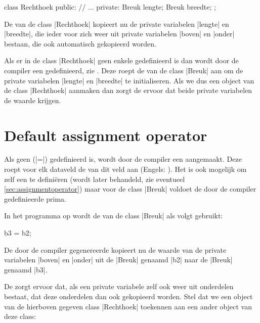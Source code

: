 \begin{cpplstShortInline}
\begin{cpplstfragment}
class Rechthoek {
public:
    // ...
private:
    Breuk lengte;
    Breuk breedte;
};
\end{cpplstfragment}

De  van de class |Rechthoek| kopieert nu de private variabelen |lengte| en |breedte|, die ieder voor zich weer uit private variabelen |boven| en |onder| bestaan, die ook automatisch gekopieerd worden.

Als er in de class |Rechthoek| geen enkele  gedefinieerd is dan wordt door de compiler een  gedefinieerd, zie . Deze  roept de  van de class |Breuk| aan om de private variabelen |lengte| en |breedte| te initialiseren. Als we dus een object van de class |Rechthoek| aanmaken dan zorgt de  ervoor dat beide private variabelen de waarde  krijgen.

\section{Default assignment operator}
\label{sec:defaultassignmentoperator}
Als geen  (|=|) gedefinieerd is, wordt door de compiler een \emph{} aangemaakt.
Deze  roept voor elk dataveld de  van dit veld aan (Engels: \emph{}). 
Het is ook mogelijk om zelf een  te definiëren (wordt later behandeld, zie eventueel \cref{sec:assignmentoperator}) maar voor de class |Breuk| voldoet de door de compiler gedefinieerde  prima.

In het programma op  wordt de  van de class |Breuk| als volgt gebruikt:

\begin{cpplstfragment}
    b3 = b2;
\end{cpplstfragment}

De door de compiler gegenereerde  kopieert nu de waarde van de private variabelen |boven| en |onder| uit de |Breuk| genaamd |b2| naar de |Breuk| genaamd |b3|.

De  zorgt ervoor dat, als een private variabele zelf ook weer uit onderdelen bestaat, dat deze onderdelen dan ook gekopieerd worden. Stel dat we een object van de hierboven gegeven class |Rechthoek| toekennen aan een ander object van deze class: 


\end{cpplstShortInline}
